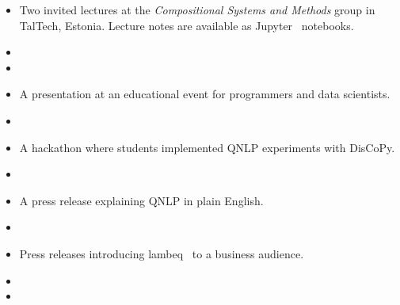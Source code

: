 \begin{itemize}
\item Two invited lectures at the \emph{Compositional Systems and Methods} group in TalTech, Estonia.
Lecture notes are available as Jupyter~\cite{KluyverEtAl16} notebooks.
\end{itemize}
\begin{itemize}[label={}]
\item {}\vspace{-10pt}
\item {}\vspace{-10pt}
\end{itemize}

\begin{itemize}
\item A presentation at an educational event for programmers and data scientists.
\end{itemize}
\begin{itemize}[label={}]
\item {}
\end{itemize}

\begin{itemize}
\item A hackathon where students implemented QNLP experiments with DisCoPy.
\end{itemize}
\begin{itemize}[label={}]
\item {}\vspace{-10pt}
\end{itemize}

\begin{itemize}
\item A press release explaining QNLP in plain English.
\end{itemize}
\begin{itemize}[label={}]
\item {}\vspace{-10pt}
\end{itemize}

\begin{itemize}
\item Press releases introducing lambeq~\cite{KartsaklisEtAl21} to a business audience.
\end{itemize}
\begin{itemize}[label={}]
\item {}\vspace{-10pt}
\item {}\vspace{-10pt}
\end{itemize}
